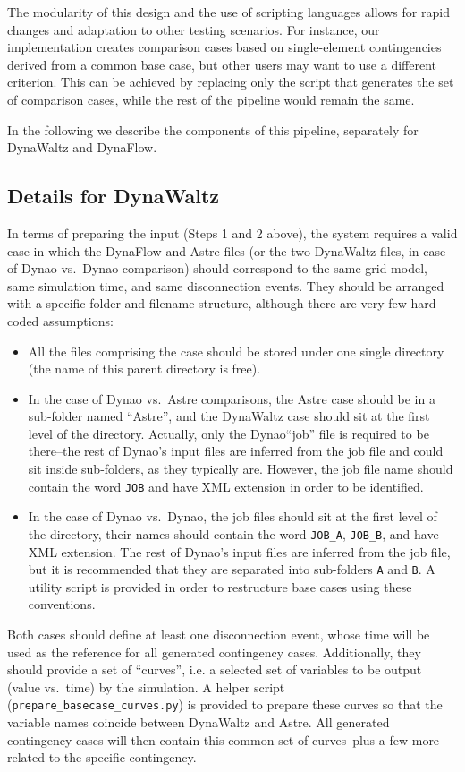 \documentclass[conference]{IEEEtran}
\newcommand{\Dynawo}{Dyna\textomega o\xspace} %
\newcommand{\code}[1]{\texttt{#1}}
\begin{document}
The modularity of this design and the use of scripting languages
allows for rapid changes and adaptation to other testing
scenarios. For instance, our implementation creates comparison cases
based on single-element contingencies derived from a common base case,
but other users may want to use a different criterion. This can be
achieved by replacing only the script that generates the set of
comparison cases, while the rest of the pipeline would remain the
same.

In the following we describe the components of this pipeline, separately
for DynaWaltz and DynaFlow.


\subsection{Details for DynaWaltz}

In terms of preparing the input (Steps 1 and 2 above), the system requires a
valid case in which the DynaFlow and Astre files (or the two DynaWaltz files, in
case of \Dynawo vs.\ \Dynawo comparison) should correspond to the same grid
model, same simulation time, and same disconnection events.  They should be
arranged with a specific folder and filename structure, although there are very
few hard-coded assumptions:
\begin{itemize}
\item All the files comprising the case should be stored under one
  single directory (the name of this parent directory is free).
\item In the case of \Dynawo vs.\ Astre comparisons, the Astre case
  should be in a sub-folder named ``Astre'', and the DynaWaltz case
  should sit at the first level of the directory. Actually, only the
  \Dynawo ``job'' file is required to be there--the rest of \Dynawo's
  input files are inferred from the job file and could sit inside
  sub-folders, as they typically are.  However, the job file name
  should contain the word \code{JOB} and have XML extension in order
  to be identified.
\item In the case of \Dynawo vs.\ \Dynawo, the job files should sit at
  the first level of the directory, their names should contain the
  word \code{JOB\_A}, \code{JOB\_B}, and have XML extension. The rest
  of \Dynawo's input files are inferred from the job file, but it is
  recommended that they are separated into sub-folders \code{A} and
  \code{B}. A utility script is provided in order to restructure base
  cases using these conventions.
\end{itemize}
Both cases should define at least one disconnection event, whose time will be
used as the reference for all generated contingency cases.  Additionally, they
should provide a set of ``curves'', i.e. a selected set of variables to be
output (value vs.\ time) by the simulation. A helper script
(\code{prepare\_basecase\_curves.py}) is provided to prepare these curves so that
the variable names coincide between DynaWaltz and Astre. All generated
contingency cases will then contain this common set of curves--plus a few more
related to the specific contingency.
\end{document}
